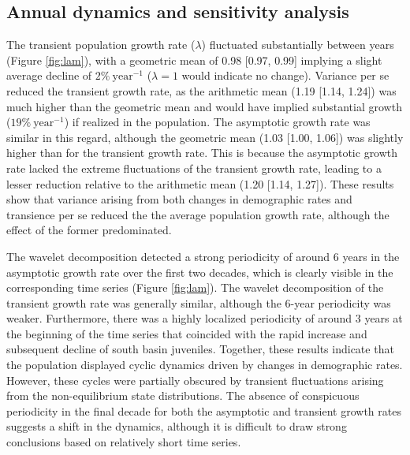 \subsection*{Annual dynamics and sensitivity analysis} 

The transient population growth rate ($\lambda$) fluctuated substantially between years
(Figure \ref{fig:lam}),
with a geometric mean of 0.98 [0.97, 0.99] implying a slight average decline
of $2\%~\text{year}^{-1}$ ($\lambda = 1$ would indicate no change).
Variance per se reduced the transient growth rate, 
as the arithmetic mean (1.19 [1.14, 1.24]) was much higher than the geometric mean
and would have implied substantial growth ($19\%~\text{year}^{-1}$)
if realized in the population.
The asymptotic growth rate was similar in this regard,
although the geometric mean (1.03 [1.00, 1.06]) was slightly higher 
than for the transient growth rate.
This is because the asymptotic growth rate lacked the extreme fluctuations 
of the transient growth rate,
leading to a lesser reduction relative to the arithmetic mean (1.20 [1.14, 1.27]).
These results show that variance arising from both changes in demographic
rates and transience per se reduced the the average population growth rate,
although the effect of the former predominated.

The wavelet decomposition detected a strong periodicity of around 6 years
in the asymptotic growth rate over the first two decades, 
which is clearly visible in the corresponding time series (Figure \ref{fig:lam}).
The wavelet decomposition of the transient growth rate was generally similar,
although the 6-year periodicity was weaker.
Furthermore, there was a highly localized periodicity of around 3 years 
at the beginning of the time series 
that coincided with the rapid increase and subsequent decline of south basin juveniles.
Together, these results indicate that the population displayed cyclic dynamics 
driven by changes in demographic rates.
However, these cycles were partially obscured by transient fluctuations arising 
from the non-equilibrium state distributions.
The absence of conspicuous periodicity in the final decade
for both the asymptotic and transient growth rates 
suggests a shift in the dynamics, 
although it is difficult to draw strong conclusions 
based on relatively short time series.

